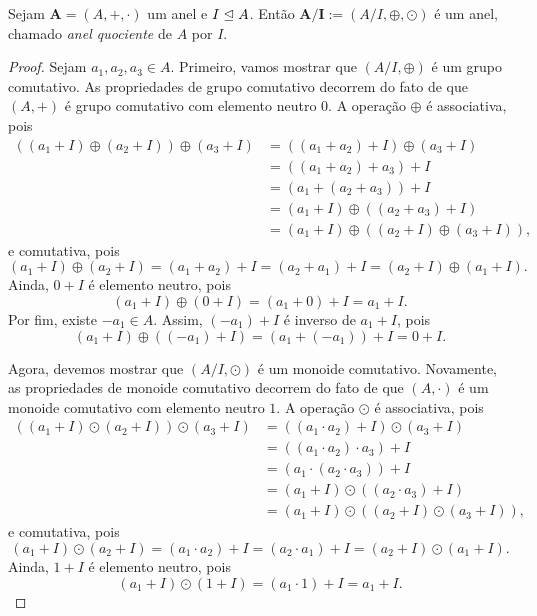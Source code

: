 \begin{prop}
	Sejam $\bm A=(A,+,\cdot)$ um anel e $I \mathrel{\unlhd} A$. Então $\bm{A/I} := (A/I,\oplus,\odot)$ é um anel, chamado \emph{anel quociente} de $A$ por $I$.
\end{prop}
\begin{proof}
	Sejam $a_1,a_2,a_3 \in A$. Primeiro, vamos mostrar que $(A/I,\oplus)$ é um grupo comutativo. As propriedades de grupo comutativo decorrem do fato de que $(A,+)$ é grupo comutativo com elemento neutro $0$. A operação $\oplus$ é associativa, pois
	\begin{align*}
	((a_1+I) \oplus (a_2+I)) \oplus (a_3+I) &= ((a_1+a_2)+I) \oplus (a_3+I) \\
		&= ((a_1+a_2)+a_3)+I \\
		&= (a_1+(a_2+a_3))+I \\
		&= (a_1+I) \oplus ((a_2+a_3)+I) \\
		&= (a_1+I) \oplus ((a_2+I) \oplus (a_3+I)),
	\end{align*}
e comutativa, pois
	\begin{equation*}
	(a_1+I) \oplus (a_2+I) = (a_1+a_2)+I = (a_2+a_1)+I = (a_2+I) \oplus (a_1+I).
	\end{equation*}
Ainda, $0+I$ é elemento neutro, pois
	\begin{equation*}
	(a_1+I) \oplus (0+I) = (a_1+0)+I = a_1+I.
	\end{equation*}
Por fim, existe $-a_1 \in A$. Assim, $(-a_1)+I$ é inverso de $a_1+I$, pois
	\begin{equation*}
	(a_1+I) \oplus ((-a_1)+I) = (a_1+(-a_1))+I = 0+I.
	\end{equation*}

	Agora, devemos mostrar que $(A/I,\odot)$ é um monoide comutativo. Novamente, as propriedades de monoide comutativo decorrem do fato de que $(A,\cdot)$ é um monoide comutativo com elemento neutro $1$. A operação $\odot$ é associativa, pois
	\begin{align*}
	((a_1+I) \odot (a_2+I)) \odot (a_3+I) &= ((a_1 \cdot a_2)+I) \odot (a_3+I) \\
		&= ((a_1 \cdot a_2) \cdot a_3)+I \\
		&= (a_1 \cdot (a_2 \cdot a_3))+I \\
		&= (a_1+I) \odot ((a_2 \cdot a_3)+I) \\
		&= (a_1+I) \odot ((a_2+I) \odot (a_3+I)),
	\end{align*}
e comutativa, pois
	\begin{equation*}
	(a_1+I) \odot (a_2+I) = (a_1 \cdot a_2)+I = (a_2 \cdot a_1)+I = (a_2+I) \odot (a_1+I).
	\end{equation*}
Ainda, $1+I$ é elemento neutro, pois
	\begin{equation*}
	(a_1+I) \odot (1+I) = (a_1 \cdot 1)+I = a_1+I.
	\end{equation*}


\end{proof}
